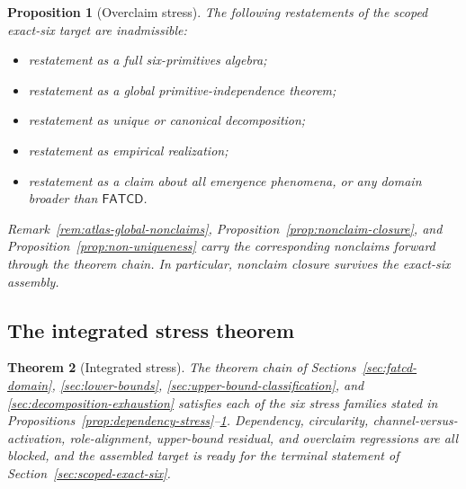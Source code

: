 \documentclass[11pt]{article}
\newtheorem{theorem}{Theorem}[section]
\newtheorem{proposition}[theorem]{Proposition}
\theoremstyle{definition}
\newcommand{\FATCD}{\ensuremath{\mathsf{FATCD}}}
\begin{document}
\begin{proposition}[Overclaim stress]\label{prop:overclaim-stress}
The following restatements of the scoped exact-six target are
inadmissible:
\begin{itemize}[topsep=2pt,itemsep=1pt]
  \item restatement as a full six-primitives algebra;
  \item restatement as a global primitive-independence theorem;
  \item restatement as unique or canonical decomposition;
  \item restatement as empirical realization;
  \item restatement as a claim about all emergence phenomena, or any
    domain broader than \FATCD{}.
\end{itemize}
Remark~\ref{rem:atlas-global-nonclaims},
Proposition~\ref{prop:nonclaim-closure}, and
Proposition~\ref{prop:non-uniqueness} carry the corresponding nonclaims
forward through the theorem chain. In particular, nonclaim closure
survives the exact-six assembly.
\end{proposition}

\subsection{The integrated stress theorem}\label{subsec:integrated-stress-theorem}

\begin{theorem}[Integrated stress]\label{thm:integrated-stress}
The theorem chain of Sections~\ref{sec:fatcd-domain},
\ref{sec:lower-bounds}, \ref{sec:upper-bound-classification}, and
\ref{sec:decomposition-exhaustion} satisfies each of the six stress
families stated in
Propositions~\ref{prop:dependency-stress}--\ref{prop:overclaim-stress}.
Dependency, circularity, channel-versus-activation, role-alignment,
upper-bound residual, and overclaim regressions are all blocked, and
the assembled target is ready for the terminal statement of
Section~\ref{sec:scoped-exact-six}.
\end{theorem}
\end{document}
